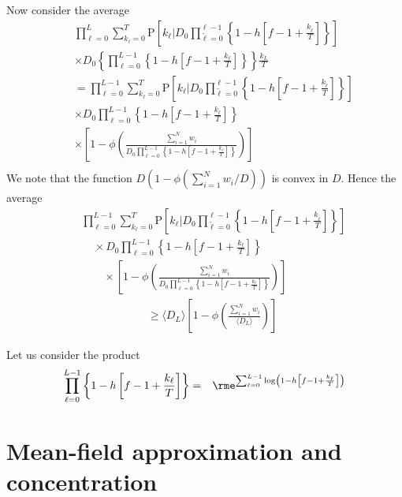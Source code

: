 \documentclass[10pt]{iopart}
\newcommand{\1}{\mathbf{1}}
\newcommand{\Prob}{\mathrm{P}}
\begin{document}
%
Now consider the average
%
\begin{eqnarray}
%
&&\prod_{\ell=0}^{L}\sum_{k_{\ell}=0}^T\Prob\left[k_\ell\Bigg\vert D_{0}\prod_{\tilde{\ell}=0}^{\ell-1}\left\{1- h\left[f- 1+\frac{k_{\tilde{\ell}}}{T}\right]\right\}\right]\nonumber\\
%
&&\times D_{0}\left\{\prod_{\ell=0}^{L-1}\left\{1- h\left[f- 1+\frac{k_{\ell}}{T}\right]\right\}\right\}\frac{k_L}{T}\nonumber\\
%
&&=\prod_{\ell=0}^{L-1}\sum_{k_{\ell}=0}^T\Prob\left[k_\ell\Bigg\vert D_{0}\prod_{\tilde{\ell}=0}^{\ell-1}\left\{1- h\left[f- 1+\frac{k_{\tilde{\ell}}}{T}\right]\right\}\right]\nonumber\\
%
&&\times D_{0}\prod_{\ell=0}^{L-1}\left\{1- h\left[f- 1+\frac{k_{\ell}}{T}\right]\right\}\nonumber\\
%
&&\times\left[1-\phi\left(\frac{\sum_{i=1}^Nw_i}{D_{0}\prod_{\ell=0}^{L-1}\left\{1- h\left[f- 1+\frac{k_{\ell}}{T}\right]\right\}}\right)\right]\nonumber\\
%
\end{eqnarray}
%
We note that the function $D(1-\phi(\sum_{i=1}^Nw_i/D))$ is convex in $D$. Hence the average 
%
\begin{eqnarray}
%
&&\prod_{\ell=0}^{L-1}\sum_{k_{\ell}=0}^T\Prob\left[k_\ell\Bigg\vert D_{0}\prod_{\tilde{\ell}=0}^{\ell-1}\left\{1- h\left[f- 1+\frac{k_{\tilde{\ell}}}{T}\right]\right\}\right]\nonumber\\
%
&&~~~~~\times D_{0}\prod_{\ell=0}^{L-1}\left\{1- h\left[f- 1+\frac{k_{\ell}}{T}\right]\right\}\nonumber\\
%
&&~~~~~~~~~\times\left[1-\phi\left(\frac{\sum_{i=1}^Nw_i}{D_{0}\prod_{\ell=0}^{L-1}\left\{1- h\left[f- 1+\frac{k_{\ell}}{T}\right]\right\}}\right)\right]\nonumber\\
%
&&~~~~~~~~~~~~~~~~~~~~~~~~~~~\geq \langle D_{L}\rangle\left[1-\phi\left(\frac{\sum_{i=1}^Nw_i}{\langle D_{L}\rangle}\right)\right]
%
\end{eqnarray}
%


Let us consider the product 
%
%
\begin{eqnarray}
%
\prod_{\ell=0}^{L-1}\left\{1- h\left[f- 1+\frac{k_{\ell}}{T}\right]\right\}&=&\rme^{\sum_{\ell=0}^{L-1}\log\left(1- h\left[f- 1+\frac{k_{\ell}}{T}\right]\right)}
%
\end{eqnarray}

\section{Mean-field approximation and concentration}
\end{document}
